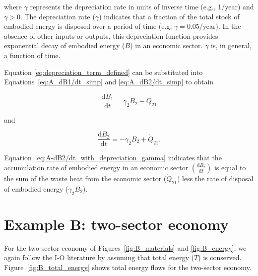 \noindent where $\gamma$ represents the depreciation rate 
in units of inverse time (e.g., 1/year) and $\gamma > 0$. 
The depreciation rate ($\gamma$) indicates that 
a fraction of the total stock of embodied energy 
is disposed over a period of time (e.g, $\gamma = 0.05$/year). 
In the absence of other inputs or outputs, 
this depreciation function provides exponential decay 
of embodied energy ($B$) in an economic sector. 
$\gamma$ is, in general, a function of time.

Equation \ref{eq:depreciation_term_defined} 
can be substituted into Equations~\ref{eq:A_dB1/dt_simp}
and \ref{eq:A_dB2/dt_simp} to obtain 

\begin{equation} \label{eq:A-dB1/dt_with_depreciation_gamma}
	\frac{\mathrm{d}B_{1}}{\mathrm{d}t} 
	= \gamma_{2}B_{2}
	- \dot{Q}_{21} 
\end{equation}

\noindent and

\begin{equation} \label{eq:A-dB2/dt_with_depreciation_gamma}
	\frac{\mathrm{d}B_{2}}{\mathrm{d}t} 
	= - \gamma_{2}B_{2}
	+ \dot{Q}_{21}.
\end{equation}

\noindent Equation~\ref{eq:A-dB2/dt_with_depreciation_gamma} 
indicates that the accumulation rate 
of embodied energy in an economic sector 
$\left( \frac{\mathrm{d}B_{2}}{\mathrm{d}t} \right)$
is equal to the sum of the waste heat from the economic sector 
($\dot{Q}_{21}$) less the rate of disposal of embodied energy 
($\gamma_{2}B_{2}$).


\section{Example B: two-sector economy}

For the two-sector economy of Figures~\ref{fig:B_materials}
and \ref{fig:B_energy}, we again follow the I-O literature 
by assuming that total energy ($T$) is conserved. 
Figure~\ref{fig:B_total_energy} shows total energy
flows for the two-sector economy.

